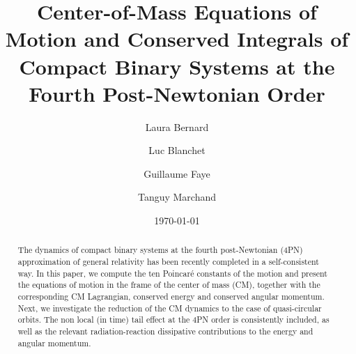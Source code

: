 \documentclass[prd,preprint,superscriptaddress,tightenlines,nofootinbib,
  eqsecnum,showpacs]{revtex4}
\begin{document}
\title{Center-of-Mass Equations of Motion and Conserved Integrals of Compact Binary Systems at the Fourth Post-Newtonian Order} 

\author{Laura Bernard}

\author{Luc Blanchet}

\author{Guillaume Faye}

\author{Tanguy Marchand}

\date{\today}

\begin{abstract}
  The dynamics of compact binary systems at the fourth post-Newtonian (4PN)
  approximation of general relativity has been recently completed in a
  self-consistent way. In this paper, we compute the ten Poincar\'e constants
  of the motion and present the equations of motion in the frame of the center
  of mass (CM), together with the corresponding CM Lagrangian, conserved
  energy and conserved angular momentum. Next, we investigate the reduction of
  the CM dynamics to the case of quasi-circular orbits. The non local (in
  time) tail effect at the 4PN order is consistently included, as well as the
  relevant radiation-reaction dissipative contributions to the energy and
  angular momentum.
\end{abstract}
\end{document}
